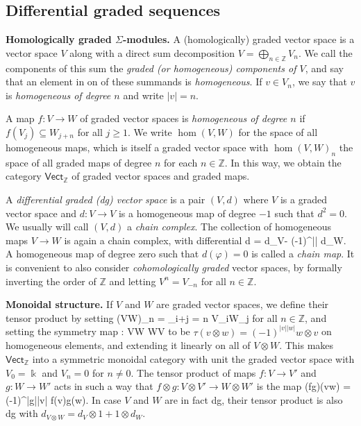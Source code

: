 \documentclass[fleqn,a4paper, twoside]{article}
\makeatletter
\newcommand{\0}{\langle 0\rangle}
\let\[\@undefined
\DeclareRobustCommand{\[}{\begin{equation}}%
\let\]\@undefined
\DeclareRobustCommand{\]}{\end{equation}}%
\theoremstyle{mytheorem}
\theoremstyle{introthm}
\theoremstyle{mydefinition}
\theoremstyle{mydefinition2}
\theoremstyle{plain} %
\newcommand{\?}{\,?\,}
\newcommand{\kk}{\Bbbk}
\theoremstyle{mytheorem}
\theoremstyle{plain} %
\makeatother
\begin{document}
\subsection{Differential graded sequences}


\textbf{Homologically graded $\Sigma$-modules.}
A (homologically) graded vector space is a
vector space $V$ along with a direct sum
decomposition $V = \bigoplus_{n\in\mathbb Z} V_n$.
We call the components of this sum the \emph{graded (or
homogeneous)
components of $V$}, and say that an element in 
on of these summands is \emph{homogeneous}. If
$v\in V_n$, we say that $v$ is \emph{homogeneous of
degree $n$} and write $|v|=n$. 

A map $f : V\longrightarrow W$ of graded vector spaces
is \emph{homogeneous of degree $n$} if $f(V_j)\subseteq W_{j+n}$ for
all $j\geqslant 1$. We write $\hom(V,W)$ for the
space of all homogeneous maps, which is itself a graded
vector space with $\hom(V,W)_n$ the space of all
graded maps of degree $n$ for each $n\in\mathbb Z$. 
In this way, we obtain the category $\mathsf{Vect}_\mathbb{Z}$
of graded vector spaces and graded maps. 

A \emph{differential graded (dg) vector space} is a pair 
$(V,d)$ where $V$ is a graded vector space and 
$d : V\longrightarrow V$ is a homogeneous map of degree 
$-1$ such that $d^2=0$. We usually will call $(V,d)$
a \emph{chain complex}. The collection of homogeneous
maps $V\longrightarrow W$ is again a chain
complex, with differential
\[ d\varphi 
	= d_V\varphi - (-1)^{|\varphi|} \varphi d_W. \]
A homogeneous map of degree zero such that $d(\varphi)=0$
is called a \emph{chain map}.
It is
convenient to also consider \emph{cohomologically graded}
vector spaces, by formally inverting the order of $\mathbb{Z}$
and letting $V^n = V_{-n}$ for all $n\in\mathbb Z$. 

\bigskip

\textbf{Monoidal structure.} If $V$ and $W$ are
graded vector spaces, we define their tensor product
by setting
\[ (V\otimes W)_n = \bigoplus_{i+j = n} V_i\otimes W_j \]
for all $n\in\mathbb Z$, and setting the symmetry map
\[\tau : V\otimes W \longrightarrow W\otimes V\]
to be $\tau(v\otimes w) = (-1)^{|v||w|}w\otimes v$
on homogeneous elements, and extending it linearly on all of
$V\otimes W$. This makes $\mathsf{Vect}_\mathbb{Z}$ into a
symmetric monoidal category with unit the graded vector
space with $V_0 = \kk$ and $V_n = 0$ for $n\neq 0$.
The tensor product of maps $f: V\longrightarrow V'$
and $g : W\longrightarrow W'$ acts
in such a way that $f\otimes g : V\otimes V'
\longrightarrow W\otimes W'$ is the map
\[ (f\otimes g)(v\otimes w)  = (-1)^{|g||v|} f(v)\otimes g(w).\]
In case $V$ and $W$ are in fact dg, their tensor product is
also dg with $d_{V\otimes W} = d_V\otimes 1+ 1\otimes d_W$. 
\end{document}
